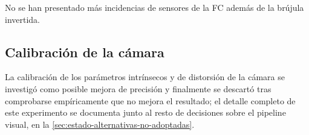 No se han presentado más incidencias de sensores de la FC además de la brújula invertida.

\subsection{Calibración de la cámara}
\label{sec:referencia-problema-calibracion}

La calibración de los parámetros intrínsecos y de distorsión de la cámara se investigó como posible mejora de precisión y finalmente se descartó tras comprobarse empíricamente que no mejora el resultado; el detalle completo de este experimento se documenta junto al resto de decisiones sobre el pipeline visual, en la \autoref{sec:estado-alternativas-no-adoptadas}.

